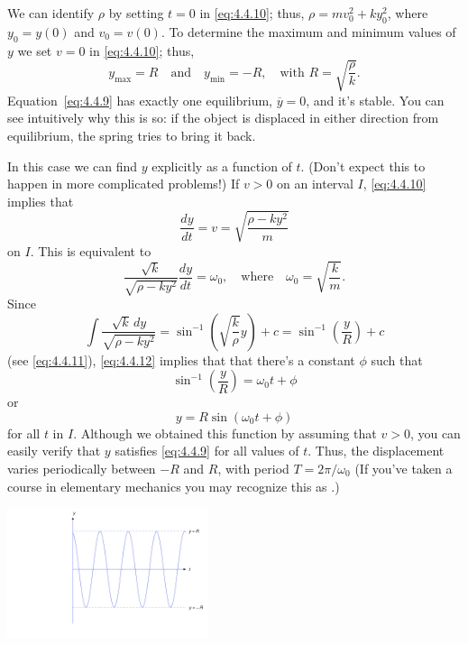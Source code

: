 \documentclass{ximera}
\begin{document}
\begin{example}
 
We can identify $\rho$ by setting $t=0$ in \eqref{eq:4.4.10};   thus,
$\rho=mv_0^2+ky_0^2$, where $y_0=y(0)$ and $v_0=v(0)$. To determine
the maximum and minimum values of $y$ we set $v=0$ in \eqref{eq:4.4.10};
thus,
\begin{equation} \label{eq:4.4.11}
y_{\max}=R\quad\mbox{and}\quad
y_{\min}=-R,\quad\mbox{with } R=\sqrt{\frac{\rho}{k}}.
\end{equation}
Equation~\eqref{eq:4.4.9} has exactly one equilibrium, $\overline{y}=0$,
and
it's stable. You can see intuitively why this is so: if the object is
displaced in either direction from  equilibrium, the spring tries
to bring it back.
 
In this case we can find $y$ explicitly as a function of $t$. (Don't
expect this to happen in more complicated problems!) If $v>0$ on an
interval $I$,  \eqref{eq:4.4.10} implies that
$$
\frac{dy}{dt}=v=\sqrt{\frac{\rho-ky^2}{m}}
$$
on $I$. This is equivalent to
\begin{equation} \label{eq:4.4.12}
\frac{\sqrt{k}}{\sqrt{\rho-ky^2}}\frac{dy}{dt}=\omega_0,\quad\mbox{where}\quad
\omega_0=\sqrt{\frac{k}{m}}.
\end{equation}
Since
$$
\int\frac{\sqrt{k}\,dy}{\sqrt{\rho-ky^2}}=\sin^{-1}\left(\sqrt{\frac{k}{\rho}}y\right)+c=\sin^{-1}\left(\frac{y}{R}\right)+c
$$
(see \eqref{eq:4.4.11}), \eqref{eq:4.4.12} implies that that there's a
constant $\phi$ such that
$$
\sin^{-1}\left(\frac{y}{R}\right)=\omega_0 t+\phi
$$
or
$$
y=R\sin(\omega_0 t+\phi)
$$
for all $t$ in $I$. Although we obtained this function by assuming that
$v>0$, you can easily verify that $y$ satisfies \eqref{eq:4.4.9} for all
values of $t$. Thus, the displacement varies periodically between $-R$
and $R$, with period $T=2\pi/\omega_0$ (If
you've taken a course in elementary mechanics you may recognize this
as .)
 
 
\begin{image}
 \includegraphics[height=1.5in]{fig040404.jpg}
\end{image}
 
\end{example}
 
\end{document}

